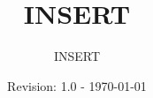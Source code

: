 \begin{titlepage} 							%
\title{INSERT}
\author{INSERT}
\date{Revision: 1.0 - \today}
\maketitle
\end{titlepage}									%